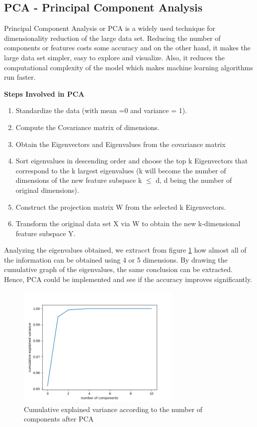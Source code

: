 \documentclass[twoside,a4paper,12pt]{report}
\begin{document}
\subsection{PCA - Principal Component Analysis}

Principal Component Analysis or PCA is a widely used technique for dimensionality 
reduction of the large data set. Reducing the number of components or features costs
 some accuracy and on the other hand, it makes the large data set simpler, easy to 
 explore and visualize. Also, it reduces the computational complexity of the model 
 which makes machine learning algorithms run faster.

\textbf{Steps Involved in PCA}
\begin{enumerate}
    \item Standardize the data (with mean =0 and variance = 1).
    \item Compute the Covariance matrix of dimensions.
    \item Obtain the Eigenvectors and Eigenvalues from the covariance matrix
    \item Sort eigenvalues in descending order and choose the top k Eigenvectors 
    that correspond to the k largest eigenvalues (k will become the number of 
    dimensions of the new feature subspace k $\leq$ d, d being the number of original dimensions).
    \item Construct the projection matrix W from the selected k Eigenvectors.
    \item Transform the original data set X via W to obtain the new k-dimensional feature subspace Y.
\end{enumerate}

Analyzing the eigenvalues obtained,  we extracct from figure \ref{PCAChosenComponents} how almost all of the information
can be obtained using 4 or 5 dimensions.
By drawing the cumulative graph of the eigenvalues, the same conclusion can be extracted.
Hence, PCA could be implemented and see if the accuracy improves significantly.
\begin{figure}[H]
    \centering
    \includegraphics[width=0.7\textwidth,height=0.4\textheight]{cumulative_explained_variance.png}
    \caption{Cumulative explained variance according to the number of components after PCA     \label{PCAChosenComponents} 
    }
\end{figure}
\end{document}

